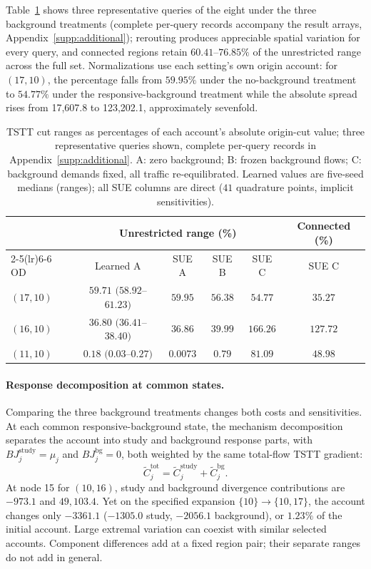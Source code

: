 Table~\ref{tab:cutspreadperod} shows three representative queries of the eight under the three background treatments (complete per-query records accompany the result arrays, Appendix~\ref{supp:additional}); rerouting produces appreciable spatial variation for every query, and connected regions retain $60.41$--$76.85\%$ of the unrestricted range across the full set. Normalizations use each setting's own origin account: for $(17,10)$, the percentage falls from $59.95\%$ under the no-background treatment to $54.77\%$ under the responsive-background treatment while the absolute spread rises from 17,607.8 to 123,202.1, approximately sevenfold.
\begin{table}[pos=htbp]
\footnotesize
\caption{TSTT cut ranges as percentages of each account's absolute
origin-cut value; three representative queries shown, complete per-query
records in Appendix~\ref{supp:additional}. A: zero background; B: frozen background
flows; C: background demands fixed, all traffic re-equilibrated. Learned
values are five-seed medians (ranges); all SUE columns are direct
($41$ quadrature points, implicit sensitivities).}\label{tab:cutspreadperod}
\small
\begin{tabular*}{\tblwidth}{@{\extracolsep{\fill}}lccccc}
\toprule
& \multicolumn{4}{c}{Unrestricted range (\%)} & Connected (\%)\\
\cmidrule(lr){2-5}\cmidrule(lr){6-6}
OD & Learned A & SUE A & SUE B & SUE C & SUE C\\
\midrule
$(17,10)$ & $59.71$ $(58.92$--$61.23)$ & $59.95$ & $56.38$ & $54.77$ & $35.27$ \\
$(16,10)$ & $36.80$ $(36.41$--$38.40)$ & $36.86$ & $39.99$ & $166.26$ & $127.72$ \\
$(11,10)$ & $0.18$ $(0.03$--$0.27)$ & $0.0073$ & $0.79$ & $81.09$ & $48.98$ \\
\bottomrule
\end{tabular*}
\end{table}
\paragraph{Response decomposition at common states.}\label{subsec:bgsplit}
Comparing the three background treatments changes both costs and sensitivities. At each common responsive-background state, the mechanism decomposition separates the account into study and background response parts, with $BJ_j^{\mathrm{study}}=\mu_j$ and $BJ_j^{\mathrm{bg}}=0$, both weighted by the same total-flow TSTT gradient:
\begin{equation}
\widetilde C_j^{\mathrm{tot}}=\widetilde C_j^{\mathrm{study}}+\widetilde C_j^{\mathrm{bg}}.
\label{eq:bg_attribution}
\end{equation}
At node 15 for $(10,16)$, study and background divergence contributions are $-973.1$ and $49{,}103.4$. Yet on the specified expansion $\{10\}\to\{10,17\}$, the account changes only $-3361.1$ ($-1305.0$ study, $-2056.1$ background), or $1.23\%$ of the initial account. Large extremal variation can coexist with similar selected accounts. Component differences add at a fixed region pair; their separate ranges do not add in general.

